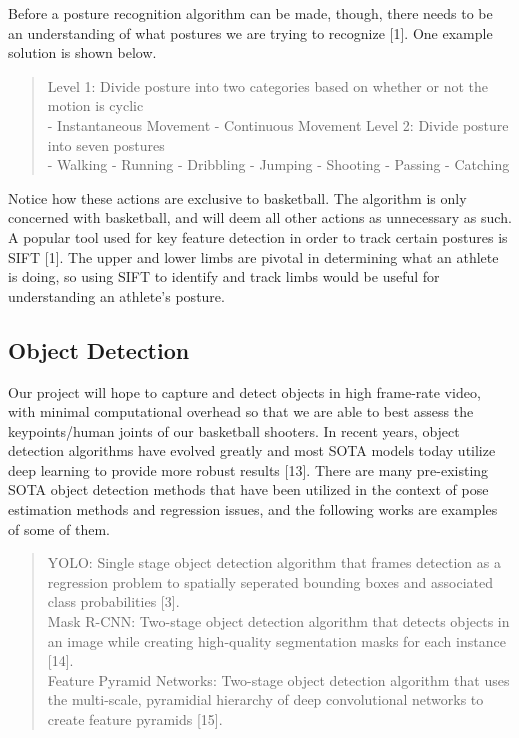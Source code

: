 \documentclass[10pt,twocolumn,letterpaper]{article}
\begin{document}
Before a posture recognition algorithm can be made, though, there needs to be an understanding of what postures we are trying to recognize [1]. One example solution is shown below. 
%
\begin{quotation}
  Level 1: Divide posture into two categories based on whether or not the motion is cyclic \\
  \indent - Instantaneous Movement 
  \indent - Continuous Movement 
  \newline
  \indent Level 2: Divide posture into seven postures \\
  \indent - Walking 
  \indent - Running 
  \indent - Dribbling 
  \indent - Jumping 
  \indent - Shooting 
  \indent - Passing 
  \indent - Catching 
\end{quotation}
%

Notice how these actions are exclusive to basketball. The algorithm is only concerned with basketball, and will deem all other actions as unnecessary as such. 
A popular tool used for key feature detection in order to track certain postures is SIFT [1]. The upper and lower limbs are pivotal in determining what an athlete is doing, 
so using SIFT to identify and track limbs would be useful for understanding an athlete's posture. 

\subsection{Object Detection}

Our project will hope to capture and detect objects in high frame-rate video, with minimal computational overhead so that we are able to best assess the keypoints/human joints of our basketball shooters. 
In recent years, object detection algorithms have evolved greatly and most SOTA models today utilize deep learning to provide more robust results [13]. There are many pre-existing SOTA object detection methods that have been utilized in the context of pose estimation methods and regression issues, and the following works are examples of some of them.

\begin{quotation}
  YOLO: Single stage object detection algorithm that frames detection as a regression problem to spatially seperated bounding boxes and associated class probabilities [3].\\
  \newline
  \indent Mask R-CNN: Two-stage object detection algorithm that detects objects in an image while creating high-quality segmentation masks for each instance [14].\\
  \newline
  \indent Feature Pyramid Networks: Two-stage object detection algorithm that uses the multi-scale, pyramidial hierarchy of deep convolutional networks to create feature pyramids [15]. \\
\end{quotation}
\end{document}
